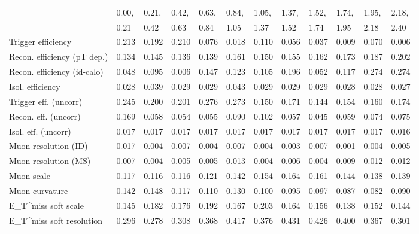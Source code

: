 \begin{tabular}{l|p{0.6cm}p{0.6cm}p{0.6cm}p{0.6cm}p{0.6cm}p{0.6cm}p{0.6cm}p{0.6cm}p{0.6cm}p{0.6cm}p{0.6cm}}
\hline
   & 0.00, & 0.21, & 0.42, & 0.63, & 0.84, & 1.05, & 1.37, & 1.52, & 1.74, & 1.95, & 2.18,  \\ 
   & 0.21 & 0.42 & 0.63 & 0.84 & 1.05 & 1.37 & 1.52 & 1.74 & 1.95 & 2.18 & 2.40  \\ 
\hline
Trigger efficiency                       & 0.213 & 0.192 & 0.210 & 0.076 & 0.018 & 0.110 & 0.056 & 0.037 & 0.009 & 0.070 & 0.006 \\
Recon. efficiency (pT dep.)              & 0.134 & 0.145 & 0.136 & 0.139 & 0.161 & 0.150 & 0.155 & 0.162 & 0.173 & 0.187 & 0.202 \\
Recon. efficiency (id-calo)              & 0.048 & 0.095 & 0.006 & 0.147 & 0.123 & 0.105 & 0.196 & 0.052 & 0.117 & 0.274 & 0.274 \\
Isol. efficiency                         & 0.028 & 0.039 & 0.029 & 0.029 & 0.043 & 0.029 & 0.029 & 0.029 & 0.028 & 0.028 & 0.027 \\
Trigger eff. (uncorr)                    & 0.245 & 0.200 & 0.201 & 0.276 & 0.273 & 0.150 & 0.171 & 0.144 & 0.154 & 0.160 & 0.174 \\
Recon. eff. (uncorr)                     & 0.169 & 0.058 & 0.054 & 0.055 & 0.090 & 0.102 & 0.057 & 0.045 & 0.059 & 0.074 & 0.075 \\
Isol. eff. (uncorr)                      & 0.017 & 0.017 & 0.017 & 0.017 & 0.017 & 0.017 & 0.017 & 0.017 & 0.017 & 0.017 & 0.016 \\
Muon resolution (ID)                     & 0.017 & 0.004 & 0.007 & 0.004 & 0.007 & 0.004 & 0.003 & 0.007 & 0.001 & 0.004 & 0.005 \\
Muon resolution (MS)                     & 0.007 & 0.004 & 0.005 & 0.005 & 0.013 & 0.004 & 0.006 & 0.004 & 0.009 & 0.012 & 0.012 \\
Muon scale                               & 0.117 & 0.116 & 0.116 & 0.121 & 0.142 & 0.154 & 0.164 & 0.161 & 0.144 & 0.138 & 0.139 \\
Muon curvature                           & 0.142 & 0.148 & 0.117 & 0.110 & 0.130 & 0.100 & 0.095 & 0.097 & 0.087 & 0.082 & 0.090 \\
E_{T}^{miss} soft scale                  & 0.145 & 0.182 & 0.176 & 0.192 & 0.167 & 0.203 & 0.164 & 0.156 & 0.138 & 0.152 & 0.144 \\
E_{T}^{miss} soft resolution             & 0.296 & 0.278 & 0.308 & 0.368 & 0.417 & 0.376 & 0.431 & 0.426 & 0.400 & 0.367 & 0.301 \\

\end{tabular}
